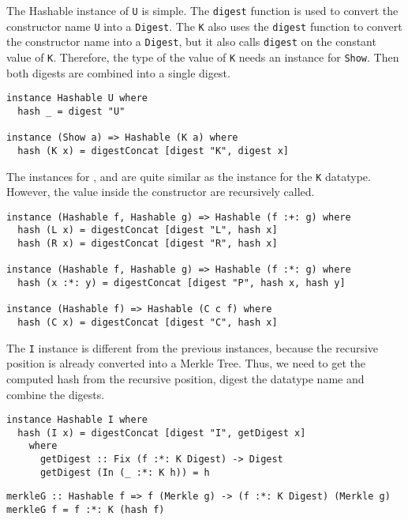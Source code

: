 The Hashable instance of \texttt{U} is simple. The \texttt{digest} function is used to convert the constructor name \texttt{U} into a \texttt{Digest}. The \texttt{K} also uses the \texttt{digest} function to convert the constructor name into a \texttt{Digest}, but it also calls \texttt{digest} on the constant value of \texttt{K}. Therefore, the type of the value of \texttt{K} needs an instance for \texttt{Show}. Then both digests are combined into a single digest. 

\begin{verbatim}
instance Hashable U where
  hash _ = digest "U"

instance (Show a) => Hashable (K a) where
  hash (K x) = digestConcat [digest "K", digest x]
\end{verbatim}

The instances for \inlinehaskell{:+:}, \inlinehaskell{:*:} and  are quite similar as the instance for the \texttt{K} datatype. However, the value inside the constructor are recursively called.

\begin{verbatim}
instance (Hashable f, Hashable g) => Hashable (f :+: g) where
  hash (L x) = digestConcat [digest "L", hash x]
  hash (R x) = digestConcat [digest "R", hash x]

instance (Hashable f, Hashable g) => Hashable (f :*: g) where
  hash (x :*: y) = digestConcat [digest "P", hash x, hash y]

instance (Hashable f) => Hashable (C c f) where
  hash (C x) = digestConcat [digest "C", hash x]
\end{verbatim}

The \texttt{I} instance is different from the previous instances, because the recursive position is already converted into a Merkle Tree. Thus, we need to get the computed hash from the recursive position, digest the datatype name and combine the digests. 

\begin{verbatim}
instance Hashable I where
  hash (I x) = digestConcat [digest "I", getDigest x]
    where
      getDigest :: Fix (f :*: K Digest) -> Digest
      getDigest (In (_ :*: K h)) = h
\end{verbatim}

\begin{verbatim}
merkleG :: Hashable f => f (Merkle g) -> (f :*: K Digest) (Merkle g)
merkleG f = f :*: K (hash f)
\end{verbatim}

